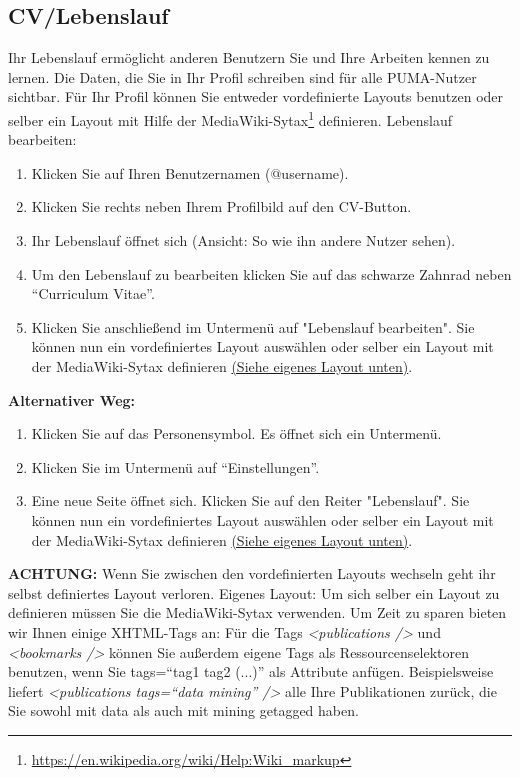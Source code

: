 \documentclass[a4paper,11pt,twoside]{scrbook}
\begin{document}
\subsection{CV/Lebenslauf}
Ihr Lebenslauf ermöglicht anderen Benutzern Sie und Ihre Arbeiten kennen zu lernen. Die Daten, die Sie in Ihr Profil schreiben sind für alle PUMA-Nutzer sichtbar. Für Ihr Profil können Sie entweder vordefinierte Layouts benutzen oder selber ein Layout mit Hilfe der MediaWiki-Sytax\footnote{\url{https://en.wikipedia.org/wiki/Help:Wiki_markup}} definieren. 
\newline
\newline
Lebenslauf bearbeiten:
\begin{enumerate}
    \item Klicken Sie auf Ihren Benutzernamen (@username).
    \item Klicken Sie rechts neben Ihrem Profilbild auf den CV-Button.
    \item Ihr Lebenslauf öffnet sich (Ansicht: So wie ihn andere Nutzer sehen).
    \item Um den Lebenslauf zu bearbeiten klicken Sie auf das schwarze Zahnrad neben \enquote{Curriculum Vitae}.
    \item Klicken Sie anschließend im Untermenü auf "Lebenslauf bearbeiten". Sie können nun ein vordefiniertes Layout auswählen oder selber ein Layout mit der MediaWiki-Sytax definieren \hyperlink{Eignes Layout}{(Siehe eigenes Layout unten)}.%
\end{enumerate}
\textbf{Alternativer Weg:} 
\begin{enumerate}
    \item Klicken Sie auf das Personensymbol. Es öffnet sich ein Untermenü.
    \item Klicken Sie im Untermenü auf \enquote{Einstellungen}.
    \item Eine neue Seite öffnet sich. Klicken Sie auf den Reiter "Lebenslauf". Sie können nun ein vordefiniertes Layout auswählen oder selber ein Layout mit der MediaWiki-Sytax definieren \hyperlink{Eigenes Layout}{(Siehe eigenes Layout unten)}.%
\end{enumerate}
\textbf{ACHTUNG:} Wenn Sie zwischen den vordefinierten Layouts wechseln geht ihr selbst definiertes Layout verloren. %
\newline
\newline
\hypertarget{Eigenes Layout}{Eigenes Layout:}
\newline
Um sich selber ein Layout zu definieren müssen Sie die MediaWiki-Sytax verwenden. Um Zeit zu sparen bieten wir Ihnen einige XHTML-Tags an: %
\newline
Für die Tags \textit{<publications />} und \textit{<bookmarks />} können Sie außerdem eigene Tags als Ressourcenselektoren benutzen, wenn Sie tags=\enquote{tag1 tag2 (...)} als Attribute anfügen. Beispielsweise liefert \textit{<publications tags=\enquote{data mining} />} alle Ihre Publikationen zurück, die Sie sowohl mit data als auch mit mining getagged haben. 
\end{document}
